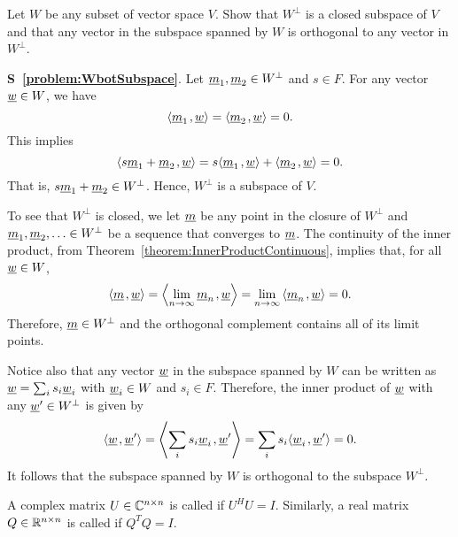 \begin{problem} \label{problem:WbotSubspace}
Let $W$ be any subset of vector space $V$.
Show that $W^{\bot}$ is a closed subspace of $V$ and that any vector in the subspace spanned by $W$ is orthogonal to any vector in $W^{\bot}$.
\end{problem}
\noindent
\textbf{S~\ref{problem:WbotSubspace}}.
Let $\underline{m}_1, \underline{m}_2 \in W^{\bot}$ and $s \in F$.
For any vector $\underline{w} \in W$, we have
\begin{equation*}
{\left\langle  \underline{m}_1  \mskip2mu ,  \underline{w}  \right\rangle}
= {\left\langle  \underline{m}_2  \mskip2mu ,  \underline{w}  \right\rangle}
= 0.
\end{equation*}
This implies
\begin{equation*}
{\left\langle  s \underline{m}_1 + \underline{m}_2  \mskip2mu ,  \underline{w}  \right\rangle}
= s {\left\langle  \underline{m}_1  \mskip2mu ,  \underline{w}  \right\rangle}
+ {\left\langle  \underline{m}_2  \mskip2mu ,  \underline{w}  \right\rangle}
= 0.
\end{equation*}
That is, $s \underline{m}_1 + \underline{m}_2 \in W^{\bot}$.
Hence, $W^{\bot}$ is a subspace of $V$.

To see that $W^{\bot}$ is closed, we let $\underline{m}$ be any point in the closure of $W^{\bot}$ and $\underline{m}_1,\underline{m}_2,\ldots \in W^{\bot}$ be a sequence that converges to $\underline{m}$.
The continuity of the inner product, from Theorem~\ref{theorem:InnerProductContinuous}, implies that, for all $\underline{w}\in W$,
\[ {\left\langle  \underline{m}  \mskip2mu ,  \underline{w}  \right\rangle} =  {\left\langle  \lim_{n\rightarrow\infty} \underline{m}_n  \mskip2mu ,  \underline{w}   \right\rangle}  =  \lim_{n\rightarrow\infty}  {\left\langle  \underline{m}_n  \mskip2mu ,  \underline{w}   \right\rangle} = 0. \]
Therefore, $\underline{m} \in W^{\bot}$ and the orthogonal complement contains all of its limit points.

Notice also that any vector $\underline{w}$ in the subspace spanned by $W$ can be written as $\underline{w} = \sum_{i} s_i \underline{w}_i$ with $\underline{w}_i \in W$ and $s_i \in F$.
Therefore, the inner product of $\underline{w}$ with any $\underline{w}' \in W^{\bot}$ is given by
\begin{equation*}
{\left\langle  \underline{w}  \mskip2mu ,  \underline{w}'  \right\rangle}
= {\left\langle  \sum_{i} s_i \underline{w}_i  \mskip2mu ,  \underline{w}'  \right\rangle} \\
= \sum_{i} s_i {\left\langle  \underline{w}_i  \mskip2mu ,  \underline{w}'  \right\rangle} \\
= 0.
\end{equation*}
It follows that the subspace spanned by $W$ is orthogonal to the subspace $W^{\bot}$.

\begin{definition}
A complex matrix $U\in \mathbb{C}^{n\times n}$ is called  if $U^H U = I$.
Similarly, a real matrix $Q\in \mathbb{R}^{n\times n}$ is called  if $Q^T Q = I$.
\end{definition}

